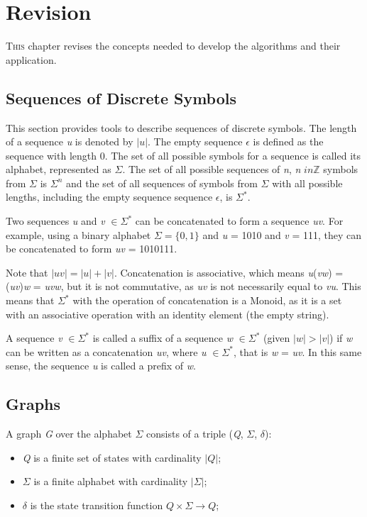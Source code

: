 \chapter{Revision}\label{cap:2}


{\lettrine[loversize=0.25,findent=0.2em,nindent=0em]{T}{his} chapter revises the concepts needed to develop the algorithms and their application.

\section{Sequences of Discrete Symbols}
This section provides tools to describe sequences of discrete symbols. The length of a sequence \textit{u} is denoted by $|\textit{u}|$. The empty sequence $\epsilon$ is defined as the sequence with length 0. The set of all possible symbols for a sequence is called its alphabet, represented as $\Sigma$. The set of all possible sequences of \textit{n}, \textit{n} $in \mathbb{Z}$ symbols from $\Sigma$ is $\Sigma^n$ and the set of all sequences of symbols from $\Sigma$ with all possible lengths, including the empty sequence sequence $\epsilon$, is $\Sigma^*$. 

Two sequences \textit{u} and \textit{v} $\in \Sigma^*$ can be concatenated to form a sequence \textit{uv}. For example, using a binary alphabet $\Sigma = \{0,1\}$ and \textit{u} = 1010 and \textit{v} = 111, they can be concatenated to form \textit{uv} = 1010111. 

Note that $|\textit{uv}| = |\textit{u}| + |\textit{v}|$. Concatenation is associative, which means \textit{u}(\textit{vw}) = (\textit{uv})\textit{w} = \textit{uvw}, but it is not commutative, as \textit{uv} is not necessarily equal to \textit{vu}. This means that $\Sigma^*$ with the operation of concatenation is a Monoid, as it is a set with an associative operation with an identity element (the empty string).

A sequence \textit{v} $\in \Sigma^*$ is called a suffix of a sequence \textit{w} $\in \Sigma^*$ (given $|\textit{w}| > |\textit{v}|$) if \textit{w} can be written as a concatenation \textit{uv}, where \textit{u} $\in \Sigma^*$, that is \textit{w} = \textit{uv}. In this same sense, the sequence \textit{u} is called a prefix of \textit{w}. 

\section{Graphs}

\begin{definition}\label{def:graph}
A graph \textit{G} over the alphabet $\Sigma$ consists of a triple (\textit{Q}, $\Sigma$, $\delta$):
\begin{itemize}
	\item \textit{Q} is a finite set of states with cardinality $|Q|$;
    \item $\Sigma$ is a finite alphabet with cardinality $|\Sigma|$;
    \item $\delta$ is the state transition function $Q\times\Sigma \rightarrow Q$;
\end{itemize}
\end{definition}

}
